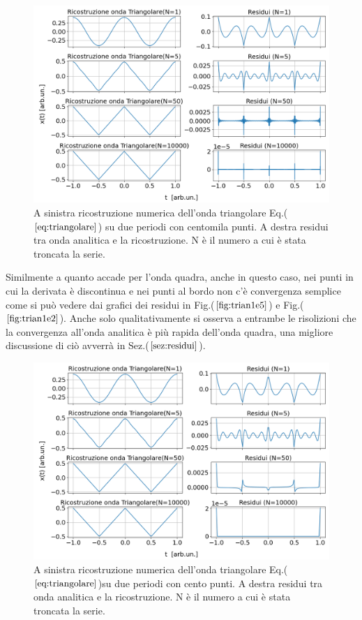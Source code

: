 \documentclass{article}
\begin{document}
        \begin{figure}[H]
            \centering
            \includegraphics[width=1\textwidth]{foutriawave1e5.png} %
            \caption{A sinistra ricostruzione numerica dell'onda triangolare
             Eq.($\ref{eq:triangolare}$) su due periodi con centomila punti.
            A destra residui tra onda analitica e la ricostruzione.
            N è il numero a cui è stata troncata la serie. }
            \label{fig:trian1e5}
        \end{figure}
        \noindent Similmente a quanto accade per l'onda quadra, anche in questo caso, nei punti 
        in cui la derivata è discontinua e nei punti al bordo non c'è convergenza
        semplice come si può vedere dai grafici dei residui in Fig.($\ref{fig:trian1e5}$) e 
        Fig.($\ref{fig:trian1e2}$).
        Anche solo qualitativamente si osserva a entrambe le risolizioni che 
        la convergenza all'onda analitica è più rapida dell'onda quadra, una migliore discussione di ciò avverrà in
        Sez.($\ref{sez:residui}$).
        \begin{figure}[H]
            \centering
            \includegraphics[width=1\textwidth]{foutriawave1e2.png} %
            \caption{A sinistra ricostruzione numerica dell'onda triangolare
            Eq.($\ref{eq:triangolare}$)su due periodi con cento punti.
           A destra residui tra onda analitica e la ricostruzione.
           N è il numero a cui è stata troncata la serie. }
            \label{fig:trian1e2}
        \end{figure}        
        
\end{document}
